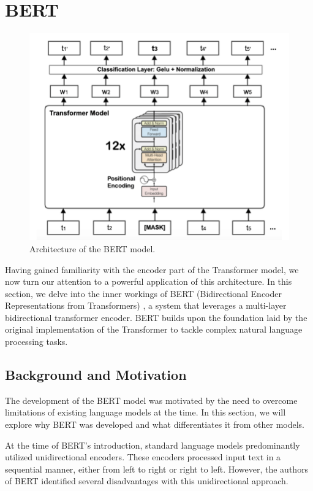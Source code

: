 \documentclass[a4paper,10pt]{report}
\begin{document}
\section{BERT}
\begin{figure} %
  \centering
  \includegraphics[width=12cm]{img/bert_architecture.png}
  \caption{Architecture of the BERT model. \cite{bertArchi}}
  \label{fig:bert_architecture}
\end{figure}
Having gained familiarity with the encoder part of the Transformer model, we now turn our attention to a powerful application of this architecture. In this section, we delve into the inner workings of BERT (Bidirectional Encoder Representations from Transformers) \cite{bert}, a system that leverages a multi-layer bidirectional transformer encoder. BERT builds upon the foundation laid by the original implementation of the Transformer to tackle complex natural language processing tasks.

\subsection{Background and Motivation}
The development of the BERT model was motivated by the need to overcome limitations of existing language models at the time. In this section, we will explore why BERT was developed and what differentiates it from other models.

At the time of BERT's introduction, standard language models predominantly utilized unidirectional encoders. These encoders processed input text in a sequential manner, either from left to right or right to left. However, the authors of BERT identified several disadvantages with this unidirectional approach.
\end{document}
